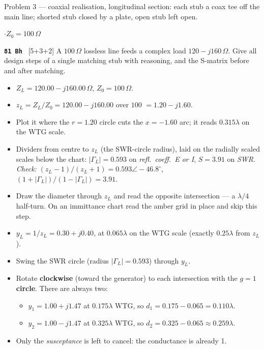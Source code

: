 {\footnotesize\color{sub} Problem 3 --- coaxial realisation, longitudinal section: each stub a coax tee off the main line; shorted stub closed by a plate, open stub left open.}

\vspace{2pt}

{\color{sub}\footnotesize {} \gap$\cdot$\gap $Z_0 = 100\,\Omega$}

\begin{asked}{\textbf{\texttt{81 Bh}} \ [5+3+2]}
A $100\,\Omega$ lossless line feeds a complex load $120-j160\,\Omega$. Give all design steps of a single matching stub with reasoning, and the S-matrix before and after matching.
\end{asked}
\begin{itemize}
  \item $Z_L = 120.00 - j160.00\,\Omega$, $Z_0 = 100\,\Omega$.
\end{itemize}
\begin{itemize}
  \item $z_L = Z_L/Z_0 = 120.00 - j160.00$ over $100$ $=1.20 - j1.60$.
  \item Plot it where the $r = 1.20$ circle cuts the $x = -1.60$ arc; it reads $0.315\lambda$ on the WTG scale.
  \item Dividers from centre to $z_L$ (the SWR-circle radius), laid on the radially scaled scales below the chart: $|\Gamma_L| = 0.593$ on \emph{refl.\ coeff.\ E or I}, $S = 3.91$ on \emph{SWR}. \textit{Check:} $(z_L-1)/(z_L+1) = 0.593\angle -46.8^\circ$, $(1+|\Gamma_L|)/(1-|\Gamma_L|) = 3.91$.
\end{itemize}
\begin{itemize}
  \item Draw the diameter through $z_L$ and read the opposite intersection --- a $\lambda/4$ half-turn. On an immittance chart read the amber grid in place and skip this step.
  \item $y_L = 1/z_L = 0.30 + j0.40$, at $0.065\lambda$ on the WTG scale (exactly $0.25\lambda$ from $z_L$).
\end{itemize}
\begin{itemize}
  \item Swing the SWR circle (radius $|\Gamma_L| = 0.593$) through $y_L$.
  \item Rotate \textbf{clockwise} (toward the generator) to each intersection with the \textbf{$g=1$ circle}. There are always two:
  \begin{itemize}
    \item $y_1 = 1.00 + j1.47$ at $0.175\lambda$ WTG, so $d_1 = 0.175 - 0.065 = 0.110\lambda$.
    \item $y_2 = 1.00 - j1.47$ at $0.325\lambda$ WTG, so $d_2 = 0.325 - 0.065 \approx 0.259\lambda$.
  \end{itemize}
  \item Only the \emph{susceptance} is left to cancel: the conductance is already 1.
\end{itemize}
